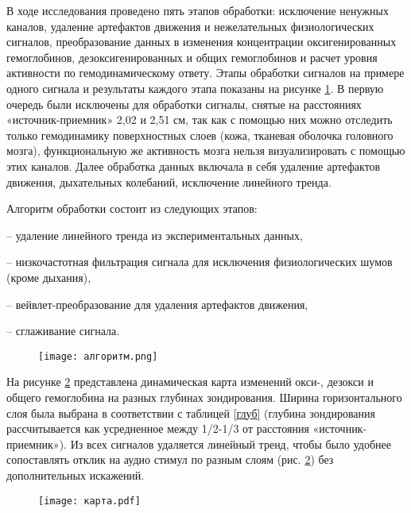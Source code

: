 В ходе исследования проведено пять этапов обработки: исключение ненужных каналов, удаление артефактов движения и нежелательных физиологических сигналов, преобразование данных в изменения концентрации оксигенированных гемоглобинов, дезоксигенированных и общих гемоглобинов и расчет уровня активности по гемодинамическому ответу. Этапы обработки сигналов на примере одного сигнала и результаты каждого этапа показаны на рисунке \ref{алг}.
В первую очередь были исключены для обработки сигналы, снятые на расстояниях «источник-приемник» 2,02 и 2,51 см, так как с помощью них можно отследить только гемодинамику поверхностных слоев (кожа, тканевая оболочка головного мозга), функциональную же активность мозга нельзя визуализировать с помощью этих каналов. 
Далее обработка данных включала в себя удаление артефактов движения, дыхательных колебаний, исключение линейного тренда. 

Алгоритм обработки состоит из следующих этапов:

– удаление линейного тренда из экспериментальных данных,

– низкочастотная фильтрация сигнала для исключения физиологических шумов (кроме дыхания),

– вейвлет-преобразование для удаления артефактов движения,

– сглаживание сигнала.
\begin{figure}[!h]
\begin{center}
\texttt{[image: алгоритм.png]}
\caption{\centering {}}
\label{алг}
\end{center}
\end{figure}

На рисунке \ref{card} представлена динамическая карта изменений окси-, дезокси и общего гемоглобина на разных глубинах зондирования. Ширина горизонтального слоя была выбрана в соответствии с таблицей \ref{глуб} (глубина зондирования рассчитывается как усредненное между 1/2-1/3 от расстояния «источник-приемник»). Из всех сигналов удаляется линейный тренд, чтобы было удобнее сопоставлять отклик на аудио стимул по разным слоям (рис. \ref{card}) без дополнительных искажений. 
\begin{figure}[!h]
\begin{center}
\texttt{[image: карта.pdf]}
\caption{\centering {}}
\label{card}
\end{center}
\end{figure}


